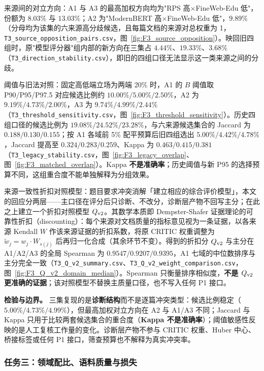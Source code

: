 来源间的对立方向：A1 与 A3 的最高加权方向均为"RPS 高$\times$FineWeb-Edu 低"，份额为 $8.03\%$ 与 $13.03\%$；A2 为"ModernBERT 高$\times$FineWeb-Edu 低"，$9.89\%$（分母均为该集的六来源高分歧候选，且每篇文档的来源对总权重为 1，\texttt{T3\_source\_opposition\_pairs.csv}，图~\ref{fig:F3_source_opposition}）。映回旧四组时，原"模型评分器"组内部的新方向在三集占 $4.44\%$、$19.33\%$、$3.68\%$（\texttt{T3\_direction\_stability.csv}），即旧的四组口径无法显示这一类来源之间的分歧。

阈值与旧法对照：固定高低端立场为两端 20\% 时，A1 的 $B$ 阈值取 P90/P95/P97.5 对应候选比例约 $10.00\%/5.00\%/2.50\%$，A2 为 $9.19\%/4.73\%/2.00\%$，A3 为 $9.74\%/4.99\%/2.44\%$（\texttt{T3\_threshold\_sensitivity.csv}，图~\ref{fig:F3_threshold_sensitivity}）。历史四组口径的候选比例为 $19.08\%/24.52\%/23.28\%$，与六来源候选集合的 Jaccard 为 $0.188/0.130/0.155$；按 A1 各域前 5\% 配平预算后旧四组选出 $5.00\%/4.42\%/4.78\%$，Jaccard 提高至 $0.324/0.283/0.259$、Kappa 为 $0.463/0.415/0.381$（\texttt{T3\_legacy\_stability.csv}，图~\ref{fig:F3_legacy_overlap}、图~\ref{fig:F3_matched_overlap}）。Kappa \textbf{不是准确率}；历史阈值与新 P95 的选择预算不同，这组重合度不能单独解释为分组效果。

来源一致性折扣对照模型：题目要求冲突消解「建立相应的综合评价模型」，本文的回应分两层——主口径在评分后只诊断、不改分，诊断层产物不回写主分；在此之上建立一个折扣对照模型 $Q_{\rm v2}$。其数学本质即 Dempster-Shafer 证据理论的可靠性折扣（discounting）\cite{shafer}：每个来源对文档质量的指标意见视为一条证据，以各来源 Kendall $W$ 作该来源证据的折扣系数，将原 CRITIC 权重调整为 $\tilde w_j=w_j\cdot W_{s(j)}$ 后再归一化合成（其余环节不变）。得到的折扣分 $Q_{\rm v2}$ 与主分在 A1/A2/A3 的全局 Spearman 为 $0.9547/0.9207/0.9395$，A1 七域的中位数排序与主分完全一致（\texttt{T3\_Q\_v2\_summary.csv}、\texttt{T3\_Q\_v2\_weight\_comparison.csv}，图~\ref{fig:F3_Q_v2_domain_median}）。Spearman 只衡量排序相似度，\textbf{不是 $Q_{\rm v2}$ 更准确的证据}；该对照模型不替换主质量口径，也不写入任何 P1 接口。

\textbf{检验与边界。} 三集复现的是\textbf{诊断结构}而不是逐篇冲突类型：候选比例稳定（$5.00\%/4.73\%/4.99\%$），但最高加权对立方向在 A2 与 A1/A3 不同；Jaccard 与 Kappa 只用于比较两套候选集合的重合度（\textbf{Kappa 不是准确率}）；阈值敏感性反映的是人工复核工作量的变化。诊断层产物不参与 CRITIC 权重、Huber 中心、桥接标签或任何 P1 接口，筛查预算也不解释为真实冲突率。

\subsubsection{任务三：领域配比、语料质量与损失}
\label{sec:5.2.3}

